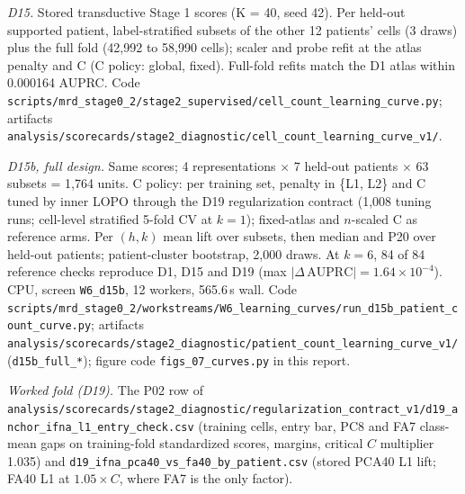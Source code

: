 {\small\raggedright
\emph{D15.} Stored transductive Stage 1 scores (K = 40, seed 42). Per held-out supported patient, label-stratified subsets of the other 12 patients' cells (3 draws) plus the full fold (42,992 to 58,990 cells); scaler and probe refit at the atlas penalty and C (C policy: global, fixed). Full-fold refits match the D1 atlas within 0.000164 AUPRC. Code \texttt{scripts/\allowbreak mrd\_stage0\_2/\allowbreak stage2\_supervised/\allowbreak cell\_count\_learning\_curve.py}; artifacts \texttt{analysis/\allowbreak scorecards/\allowbreak stage2\_diagnostic/\allowbreak cell\_count\_learning\_curve\_v1/}. 

\emph{D15b, full design.} Same scores; 4 representations $\times$ 7 held-out patients $\times$ 63 subsets = 1,764 units. C policy: per training set, penalty in \{L1, L2\} and C tuned by inner LOPO through the D19 regularization contract (1,008 tuning runs; cell-level stratified 5-fold CV at $k = 1$); fixed-atlas and $n$-scaled C as reference arms. Per $(h, k)$ mean lift over subsets, then median and P20 over held-out patients; patient-cluster bootstrap, 2,000 draws. At $k = 6$, 84 of 84 reference checks reproduce D1, D15 and D19 (max $|\Delta\,\mathrm{AUPRC}| = 1.64 \times 10^{-4}$). CPU, screen \texttt{W6\_d15b}, 12 workers, 565.6\,s wall. Code \texttt{scripts/\allowbreak mrd\_stage0\_2/\allowbreak workstreams/\allowbreak W6\_learning\_curves/\allowbreak run\_d15b\_patient\_count\_curve.py}; artifacts \texttt{analysis/\allowbreak scorecards/\allowbreak stage2\_diagnostic/\allowbreak patient\_count\_learning\_curve\_v1/} (\texttt{d15b\_full\_*}); figure code \texttt{figs\_07\_curves.py} in this report. 

\emph{Worked fold (D19).} The P02 row of \texttt{analysis/\allowbreak scorecards/\allowbreak stage2\_diagnostic/\allowbreak regularization\_contract\_v1/\allowbreak d19\_anchor\_ifna\_l1\_entry\_check.csv} (training cells, entry bar, PC8 and FA7 class-mean gaps on training-fold standardized scores, margins, critical $C$ multiplier 1.035) and \texttt{d19\_ifna\_pca40\_vs\_fa40\_by\_patient.csv} (stored PCA40 L1 lift; FA40 L1 at $1.05\times C$, where FA7 is the only factor). \par
}
